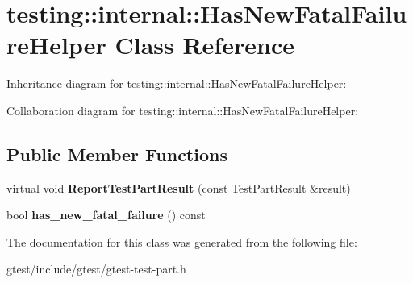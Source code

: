 \hypertarget{classtesting_1_1internal_1_1HasNewFatalFailureHelper}{}\section{testing\+:\+:internal\+:\+:Has\+New\+Fatal\+Failure\+Helper Class Reference}
\label{classtesting_1_1internal_1_1HasNewFatalFailureHelper}


Inheritance diagram for testing\+:\+:internal\+:\+:Has\+New\+Fatal\+Failure\+Helper\+:


Collaboration diagram for testing\+:\+:internal\+:\+:Has\+New\+Fatal\+Failure\+Helper\+:
\subsection*{Public Member Functions}
\begin{DoxyCompactItemize}
\item 
\mbox{\label{classtesting_1_1internal_1_1HasNewFatalFailureHelper_ac7b5e77c9847b2b057cb97193ba82441}} 
virtual void {\bfseries Report\+Test\+Part\+Result} (const \hyperlink{classtesting_1_1TestPartResult}{Test\+Part\+Result} \&result)
\item 
\mbox{\label{classtesting_1_1internal_1_1HasNewFatalFailureHelper_a91b7bac47f09076db4be0304a2110a9e}} 
bool {\bfseries has\+\_\+new\+\_\+fatal\+\_\+failure} () const
\end{DoxyCompactItemize}


The documentation for this class was generated from the following file\+:\begin{DoxyCompactItemize}
\item 
gtest/include/gtest/gtest-\/test-\/part.\+h\end{DoxyCompactItemize}

